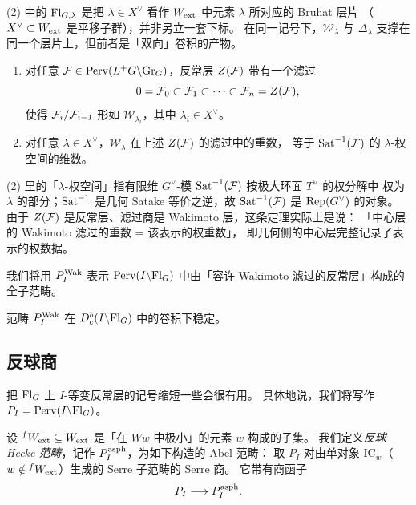 \begin{yizhu}
(2) 中的 $\mathrm{Fl}_{G,\lambda}$ 是把 $\lambda\in X^\vee$ 看作 $W_{\mathrm{ext}}$ 中元素 $\lambda$ 所对应的 Bruhat 层片
（$X^\vee\subset W_{\mathrm{ext}}$ 是平移子群），并非另立一套下标。
在同一记号下，$\mathcal{W}_\lambda$ 与 $\Delta_\lambda$ 支撑在同一个层片上，但前者是「双向」卷积的产物。
\end{yizhu}

\begin{theorem}\label{thm:wakfilt}
\begin{enumerate}[label=(\arabic*),leftmargin=2.2em,itemsep=1pt]
\item 对任意 $\mathcal{F}\in\mathrm{Perv}(L^+G\backslash\mathrm{Gr}_G)$，反常层 $Z(\mathcal{F})$ 带有一个滤过
      \[
      0=\mathcal{F}_0\subset\mathcal{F}_1\subset\cdots\subset\mathcal{F}_n=Z(\mathcal{F}),
      \]
      使得 $\mathcal{F}_i/\mathcal{F}_{i-1}$ 形如 $\mathcal{W}_{\lambda_i}$，其中 $\lambda_i\in X^\vee$。
\item 对任意 $\lambda\in X^\vee$，$\mathcal{W}_\lambda$ 在上述 $Z(\mathcal{F})$ 的滤过中的重数，
      等于 $\mathrm{Sat}^{-1}(\mathcal{F})$ 的 $\lambda$-权空间的维数。
\end{enumerate}
\end{theorem}

\begin{yizhu}
(2) 里的「$\lambda$-权空间」指有限维 $G^\vee$-模 $\mathrm{Sat}^{-1}(\mathcal{F})$ 按极大环面 $T^\vee$ 的权分解中
权为 $\lambda$ 的部分；$\mathrm{Sat}^{-1}$ 是几何 Satake 等价之逆，故 $\mathrm{Sat}^{-1}(\mathcal{F})$ 是 $\mathrm{Rep}(G^\vee)$ 的对象。
由于 $Z(\mathcal{F})$ 是反常层、滤过商是 Wakimoto 层，这条定理实际上是说：
「中心层的 Wakimoto 滤过的重数 = 该表示的权重数」，
即几何侧的中心层完整记录了表示的权数据。
\end{yizhu}

我们将用 $P_I^{\mathrm{Wak}}$ 表示 $\mathrm{Perv}(I\backslash\mathrm{Fl}_G)$ 中由「容许 Wakimoto 滤过的反常层」构成的全子范畴。

\begin{lemma}\label{lem:wakstable}
范畴 $P_I^{\mathrm{Wak}}$ 在 $D^b_c(I\backslash\mathrm{Fl}_G)$ 中的卷积下稳定。
\end{lemma}

\subsection{反球商}\label{sec:asph}

把 $\mathrm{Fl}_G$ 上 $I$-等变反常层的记号缩短一些会很有用。
具体地说，我们将写作 $P_I=\mathrm{Perv}(I\backslash\mathrm{Fl}_G)$。

设 ${}^{f}W_{\mathrm{ext}}\subseteq W_{\mathrm{ext}}$ 是「在 $Ww$ 中极小」的元素 $w$ 构成的子集。
我们定义\emph{反球 Hecke 范畴}，记作 $P_I^{\mathrm{asph}}$，为如下构造的 Abel 范畴：
取 $P_I$ 对由单对象 $\mathrm{IC}_w$（$w\notin{}^{f}W_{\mathrm{ext}}$）生成的 Serre 子范畴的 Serre 商。
它带有商函子
\[
P_I\longrightarrow P_I^{\mathrm{asph}} .
\]

